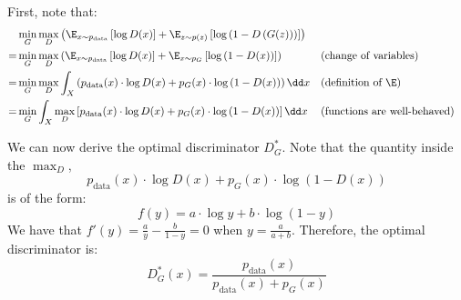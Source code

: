 First, note that:
\begin{align*}
    &\min_G\max_D \left(
        \E_{x\sim p_{\text{data}}}\left[\log D(x)\right] + \E_{z\sim p(z)}\left[\log\left(1-D\left(G(z)\right)\right)\right]
    \right) \\
    = &\min_G\max_D \left(
        \E_{x\sim p_{\text{data}}}\left[\log D(x)\right] + \E_{x\sim p_G}\left[\log\left(1-D(x)\right)\right]
    \right) && \text{(change of variables)} \\
    = &\min_G\max_D
        \int_X \left( p_{\text{data}}(x)\cdot\log D(x) + p_G(x)\cdot\log\left(1-D(x)\right) \right) \dd x
     && \text{(definition of $\E$)} \\
    = &\min_G
        \int_X \max_D \left[ p_{\text{data}}(x)\cdot\log D(x) + p_G(x)\cdot\log\left(1-D(x)\right) \right] \dd x
     && \text{(functions are well-behaved)} \\
\end{align*}

We can now derive the optimal discriminator $D_G^*$. Note that the quantity inside the $\max_D$,
\begin{equation*}
    p_{\text{data}}(x)\cdot\log D(x) + p_G(x)\cdot\log\left(1-D(x)\right)
\end{equation*}
is of the form:
\begin{equation*}
    f(y) = a\cdot\log y + b\cdot\log(1-y)
\end{equation*}
We have that $f'(y) = \frac{a}{y} - \frac{b}{1-y} = 0$ when $y = \frac{a}{a+b}$. Therefore, the optimal discriminator is:
\begin{equation*}
    D_G^*(x) = \frac{p_{\text{data}}(x)}{p_{\text{data}}(x) + p_G(x)}
\end{equation*}

